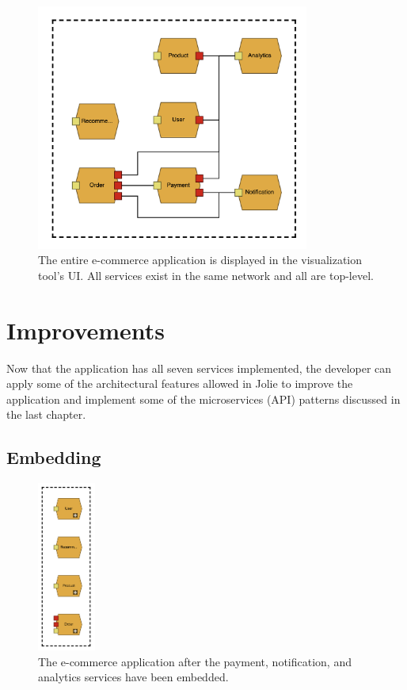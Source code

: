 \begin{figure}[t]
    \center
    \includegraphics[width=0.8\textwidth]{figures/jv_completed.png}
    \caption{The entire e-commerce application is displayed in the visualization tool's UI. All services exist in the same network and all are top-level.}
    \label{figure:jv_completed}
\end{figure}

\section{Improvements}
Now that the application has all seven services implemented, the developer can apply some of the architectural features allowed in Jolie to improve the application and implement some of the microservices (API) patterns discussed in the last chapter.

\subsection{Embedding}
\begin{figure}[t]
    \center
    \includegraphics[width=0.17\textwidth]{figures/jv_embedded.png}
    \caption{The e-commerce application after the payment, notification, and analytics services have been embedded.}
    \label{figure:jv_embedded}
\end{figure}

